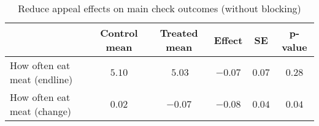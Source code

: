 \begin{table*}[ht]
\caption{Reduce appeal effects on main check outcomes (without blocking)\label{round}} 
\begin{center}
\begin{tabular}{lccccc}
\hline\hline
\multicolumn{1}{l}{}&\multicolumn{1}{c}{Control mean}&\multicolumn{1}{c}{Treated mean}&\multicolumn{1}{c}{Effect}&\multicolumn{1}{c}{SE}&\multicolumn{1}{c}{p-value}\tabularnewline
\hline
How often eat meat (endline)&$5.10$&$~5.03$&$-0.07$&$0.07$&$0.28$\tabularnewline
How often eat meat (change)&$0.02$&$-0.07$&$-0.08$&$0.04$&$0.04$\tabularnewline
\hline
\end{tabular}\end{center}

\end{table*}
